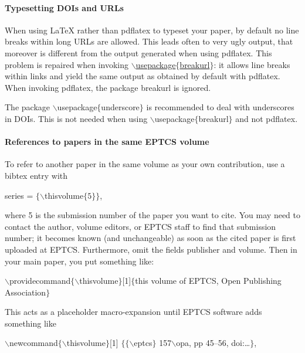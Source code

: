 \documentclass[submission,copyright,creativecommons]{eptcs}
\begin{document}
\paragraph{Typesetting DOIs and URLs}

When using {\LaTeX} rather than {\ttfamily pdflatex} to typeset your paper, by
default no line breaks within long URLs are allowed. This leads often
to very ugly output, that moreover is different from the output
generated when using {\ttfamily pdflatex}. This problem is repaired when
invoking \href{https://eptcs.web.cse.unsw.edu.au/breakurl.sty}
{\ttfamily $\backslash$usepackage$\{$breakurl$\}$}: it allows line breaks
within links and yield the same output as obtained by default with
{\ttfamily pdflatex}.
When invoking {\ttfamily pdflatex}, the package {\ttfamily breakurl} is ignored.

The package {\ttfamily $\backslash$usepackage$\{$underscore$\}$} is
recommended to deal with underscores in DOIs. This is not needed when
using {\ttfamily $\backslash$usepackage$\{$breakurl$\}$} and not {\ttfamily pdflatex}.

\paragraph{References to papers in the same EPTCS volume}

To refer to another paper in the same volume as your own contribution,
use a bibtex entry with
\begin{center}
  {\ttfamily series    = $\{\backslash$thisvolume$\{5\}\}$},
\end{center}
where 5 is the submission number of the paper you want to cite.
You may need to contact the author, volume editors, or EPTCS staff to
find that submission number; it becomes known (and unchangeable)
as soon as the cited paper is first uploaded at EPTCS\@.
Furthermore, omit the fields {\ttfamily publisher} and {\ttfamily volume}.
Then in your main paper, you put something like:

\noindent
{\small \ttfamily $\backslash$providecommand$\{\backslash$thisvolume$\}$[1]$\{$this
  volume of EPTCS, Open Publishing Association$\}$}

\noindent
This acts as a placeholder macro-expansion until EPTCS software adds
something like

\noindent
{\small \ttfamily $\backslash$newcommand$\{\backslash$thisvolume$\}$[1]%
  $\{\{\backslash$eptcs$\}$ 157$\backslash$opa, pp 45--56, doi:\dots$\}$},
\end{document}
